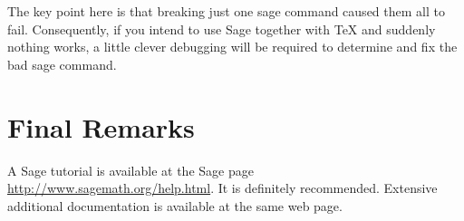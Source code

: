 \documentclass[11pt, oneside]{amsart}
\begin{document}
The key point here is that breaking just one sage command caused them all to fail. Consequently, if you intend to use Sage together with TeX and suddenly nothing works, a little clever debugging will be required to determine and fix the bad sage command.



\section{Final Remarks}
 
A Sage tutorial is available at the Sage page \url{http://www.sagemath.org/help.html}. It is definitely recommended. Extensive additional documentation is available at the same web page.
\end{document}
